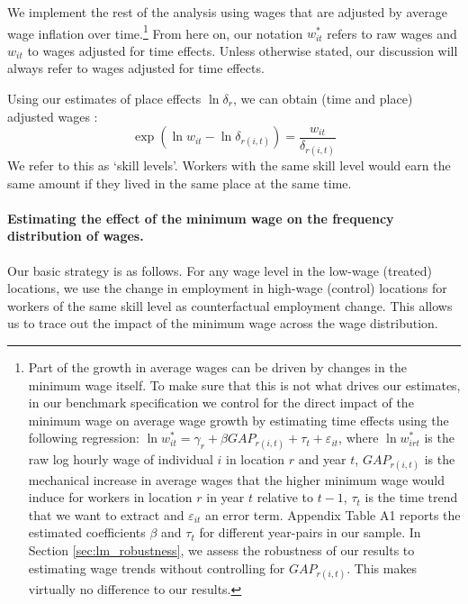 We implement the rest of the analysis using wages that are adjusted by average wage inflation over time.\footnote{\label{foot:gap}Part of the growth in average wages can be driven by changes in the minimum wage itself. To make sure that this is not what drives our estimates, in our benchmark specification we control for the direct impact of the minimum wage on average wage growth by estimating time effects using the following regression: $\ln w^*_{it}=\gamma_r + \beta GAP_{r(i,t)} + \tau_t + \varepsilon_{it}$, where $\ln w^*_{irt}$ is the raw log hourly wage of individual $i$ in location $r$ and year $t$, $GAP_{r(i,t)}$ is the mechanical increase in average wages that the higher minimum wage would induce for workers in location $r$ in year $t$ relative to $t-1$, $\tau_t$ is the time trend that we want to extract and $\varepsilon_{it}$ an error term. Appendix Table A1 reports the estimated coefficients $\beta$ and $\tau_t$ for different year-pairs in our sample. In Section \ref{sec:lm_robustness}, we assess the robustness of our results to estimating wage trends without controlling for $GAP_{r(i,t)}$. This makes virtually no difference to our results.} From here on, our notation $w^*_{it}$ refers to raw wages and $w_{it}$ to wages adjusted for time effects. Unless otherwise stated, our discussion will always refer to wages adjusted for time effects. \par

Using our estimates of place effects $\ln \delta_r$, we can obtain  (time and place) adjusted wages :
\begin{equation}\label{eq:skill_types} 
    \exp(\ln w_{it}- \ln \delta_{r(i,t)}) = \frac{w_{it}}{\delta_{r(i,t)}}
\end{equation}
We refer to this as `skill levels'. Workers with the same skill level would earn the same amount if they lived in the same place at the same time.

\paragraph{Estimating the effect of the minimum wage on the frequency distribution of wages.} Our basic strategy is as follows. For any wage level in the low-wage (treated) locations, we use the change in employment in high-wage (control) locations for workers of the same skill level as counterfactual employment change. This allows us to trace out the impact of the minimum wage across the wage distribution.

